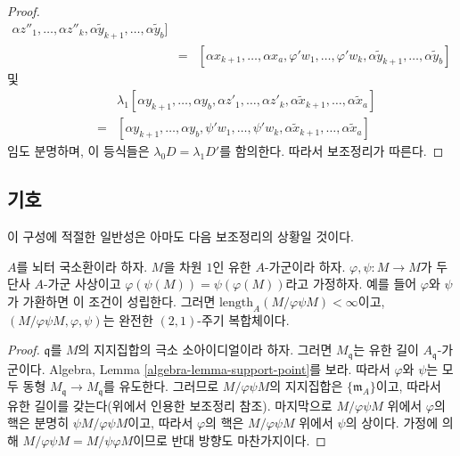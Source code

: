 \begin{proof}
\begin{eqnarray*}
\alpha z''_1, \ldots, \alpha z''_k,
\alpha \tilde y_{k + 1}, \ldots, \alpha \tilde y_b] \\
& = &
[\alpha x_{k + 1}, \ldots, \alpha x_a,
\varphi' w_1, \ldots, \varphi' w_k,
\alpha \tilde y_{k + 1}, \ldots, \alpha \tilde y_b]
\end{eqnarray*}
및
\begin{eqnarray*}
& &
\lambda_1[\alpha y_{k + 1}, \ldots, \alpha y_b,
\alpha z'_1, \ldots, \alpha z'_k,
\alpha \tilde x_{k + 1}, \ldots, \alpha \tilde x_a] \\
& = &
[\alpha y_{k + 1}, \ldots, \alpha y_b,
\psi' w_1, \ldots, \psi' w_k,
\alpha \tilde x_{k + 1}, \ldots, \alpha \tilde x_a]
\end{eqnarray*}
임도 분명하며, 이 등식들은 $\lambda_0 D = \lambda_1 D'$를 함의한다.
따라서 보조정리가 따른다.
\end{proof}








\subsection{기호}
\label{subsection-symbols}

\noindent
이 구성에 적절한 일반성은 아마도 다음 보조정리의 상황일 것이다.

\begin{lemma}
\label{lemma-pre-symbol}
$A$를 뇌터 국소환이라 하자. $M$을 차원 $1$인 유한 $A$-가군이라
하자. $\varphi, \psi : M \to M$가 두 단사 $A$-가군 사상이고
$\varphi(\psi(M)) = \psi(\varphi(M))$라고 가정하자. 예를 들어
$\varphi$와 $\psi$가 가환하면 이 조건이 성립한다. 그러면
$\text{length}_A(M/\varphi\psi M) < \infty$이고,
$(M/\varphi\psi M, \varphi, \psi)$는 완전한 $(2, 1)$-주기 복합체이다.
\end{lemma}

\begin{proof}
$\mathfrak q$를 $M$의 지지집합의 극소 소아이디얼이라 하자. 그러면
$M_{\mathfrak q}$는 유한 길이 $A_{\mathfrak q}$-가군이다.
Algebra, Lemma \ref{algebra-lemma-support-point}를 보라. 따라서
$\varphi$와 $\psi$는 모두 동형 $M_{\mathfrak q} \to M_{\mathfrak q}$를
유도한다. 그러므로 $M/\varphi\psi M$의 지지집합은
$\{\mathfrak m_A\}$이고, 따라서 유한 길이를 갖는다(위에서 인용한
보조정리 참조). 마지막으로 $M/\varphi\psi M$ 위에서 $\varphi$의 핵은
분명히 $\psi M/\varphi\psi M$이고, 따라서 $\varphi$의 핵은
$M/\varphi\psi M$ 위에서 $\psi$의 상이다. 가정에 의해
$M/\varphi\psi M = M/\psi\varphi M$이므로 반대 방향도 마찬가지이다.
\end{proof}

